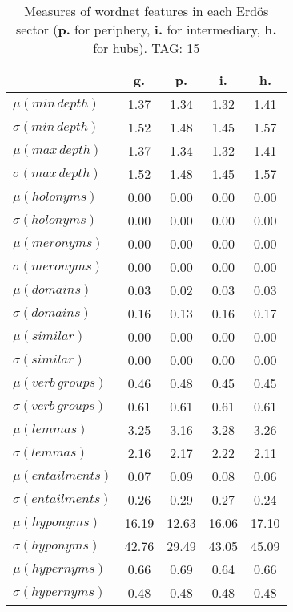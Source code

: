 \begin{table}[h!]
\begin{center}
\begin{tabular}{| l || c | c | c | c |}\hline
 & {\bf g.} & {\bf p.} & {\bf i.} & {\bf h.} \\\hline\hline
$\mu(min\,depth)$ & 1.37  & 1.34  & 1.32  & 1.41 \\
$\sigma(min\,depth)$ & 1.52  & 1.48  & 1.45  & 1.57 \\\hline
$\mu(max\,depth)$ & 1.37  & 1.34  & 1.32  & 1.41 \\
$\sigma(max\,depth)$ & 1.52  & 1.48  & 1.45  & 1.57 \\\hline
$\mu(holonyms)$ & 0.00  & 0.00  & 0.00  & 0.00 \\
$\sigma(holonyms)$ & 0.00  & 0.00  & 0.00  & 0.00 \\\hline
$\mu(meronyms)$ & 0.00  & 0.00  & 0.00  & 0.00 \\
$\sigma(meronyms)$ & 0.00  & 0.00  & 0.00  & 0.00 \\\hline
$\mu(domains)$ & 0.03  & 0.02  & 0.03  & 0.03 \\
$\sigma(domains)$ & 0.16  & 0.13  & 0.16  & 0.17 \\\hline
$\mu(similar)$ & 0.00  & 0.00  & 0.00  & 0.00 \\
$\sigma(similar)$ & 0.00  & 0.00  & 0.00  & 0.00 \\\hline
$\mu(verb\,groups)$ & 0.46  & 0.48  & 0.45  & 0.45 \\
$\sigma(verb\,groups)$ & 0.61  & 0.61  & 0.61  & 0.61 \\\hline
$\mu(lemmas)$ & 3.25  & 3.16  & 3.28  & 3.26 \\
$\sigma(lemmas)$ & 2.16  & 2.17  & 2.22  & 2.11 \\\hline
$\mu(entailments)$ & 0.07  & 0.09  & 0.08  & 0.06 \\
$\sigma(entailments)$ & 0.26  & 0.29  & 0.27  & 0.24 \\\hline
$\mu(hyponyms)$ & 16.19  & 12.63  & 16.06  & 17.10 \\
$\sigma(hyponyms)$ & 42.76  & 29.49  & 43.05  & 45.09 \\\hline
$\mu(hypernyms)$ & 0.66  & 0.69  & 0.64  & 0.66 \\
$\sigma(hypernyms)$ & 0.48  & 0.48  & 0.48  & 0.48 \\\hline
\end{tabular}
\caption{Measures of wordnet features in each Erd\"os sector ({{\bf p.}} for periphery, {{\bf i.}} for intermediary, {{\bf h.}} for hubs). TAG: 15}
\end{center}
\end{table}